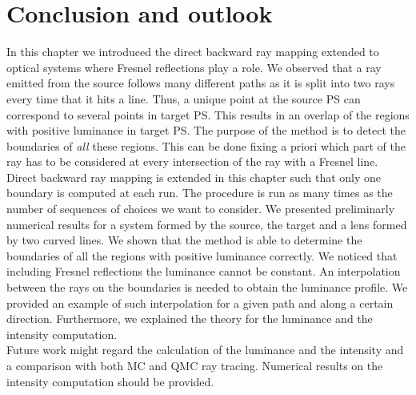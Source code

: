 \section{Conclusion and outlook}
In this chapter we introduced the direct backward ray mapping extended to optical systems where Fresnel reflections play a role. We observed that a ray emitted from the source follows many different paths as it is split into two rays every time that it hits a line. Thus, a unique point at the source PS can correspond to several points in target PS. This results in an overlap of the regions with positive luminance in target PS. The purpose of the method is to detect the boundaries of \textit{all} these regions. This can be done fixing a priori which part of the ray has to be considered at every intersection of the ray with a Fresnel line. \\\indent Direct backward ray mapping is extended in this chapter such that only one boundary is computed at each run. The procedure is run as many times as the number of sequences of choices we want to consider. We presented preliminarly numerical results for a system formed by the source, the target and a lens formed by two curved lines. We shown that the method is able to determine the boundaries of all the regions with positive luminance correctly. We noticed that including Fresnel reflections the luminance cannot be constant. An interpolation between the rays on the boundaries is needed to obtain the luminance profile. We provided an example of such interpolation for a given path and along a certain direction. Furthermore, we explained the theory for the luminance and the intensity computation. \\ \indent
Future work might regard the calculation of the luminance and the intensity and a comparison with both MC and QMC ray tracing. Numerical results on the intensity computation should be provided.





